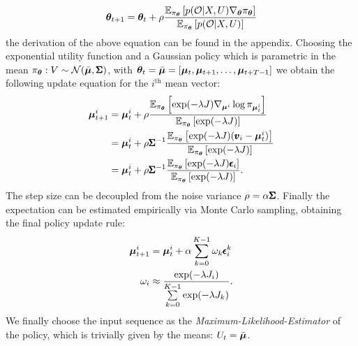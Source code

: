 \begin{equation}
    \boldsymbol{\theta}_{t+1} = \boldsymbol{\theta}_t + \rho \frac{\mathbb{E}_{\pi_{\boldsymbol{\theta}}} \left [p(\mathcal{O} | X, U) \nabla_{\boldsymbol{\theta}}\pi_{\boldsymbol{\theta}}\right]}{\mathbb{E}_{\pi_{\boldsymbol{\theta}}} \left [p(\mathcal{O} | X, U)\right]}
\end{equation}
the derivation of the above equation can be found in the appendix. 
Choosing the exponential utility function and a Gaussian policy which is parametric in the mean $\pi_{\boldsymbol{\theta}}: V \sim \mathcal{N}(\bar{\boldsymbol{\mu}}, \pmb{\Sigma})$, with $\boldsymbol{\theta}_t = \bar{\boldsymbol{\mu}} = [\boldsymbol{\mu}_t, \boldsymbol{\mu}_{t+1}, \dots, \boldsymbol{\mu}_{t+T-1}]$ we obtain the following update equation for the $i^{\text{th}}$ mean vector:
\begin{align}
    \boldsymbol{\mu}^{i}_{t+1} &=  \boldsymbol{\mu}^{i}_{t} + \rho \frac{\mathbb{E}_{\pi_{\boldsymbol{\theta}}} \left [ \exp( -\lambda J) \nabla_{\boldsymbol{\mu}^{i}} \log \pi_{\boldsymbol{\mu}^{i}_{t}}\right]}{\mathbb{E}_{\pi_{\boldsymbol{\theta}}} \left [\exp( -\lambda J)\right]} \\
    &= \boldsymbol{\mu}^{i}_{t} +  \rho \pmb{\Sigma}^{-1}\frac{\mathbb{E}_{\pi_{\boldsymbol{\theta}}} \left [\exp( -\lambda J) (\pmb{v}_i - \boldsymbol{\mu}^{i}_{t} )\right]}{\mathbb{E}_{\pi_{\boldsymbol{\theta}}} \left [\exp( -\lambda J)\right]}  \label{eq:bayes_to_mppi} \\
    &= \boldsymbol{\mu}^{i}_{t} +  \rho \pmb{\Sigma}^{-1} \frac{\mathbb{E}_{\pi_{\boldsymbol{\theta}}} \left [\exp( -\lambda J) \pmb{\epsilon}_i \right]}{\mathbb{E}_{\pi_{\boldsymbol{\theta}}} \left [\exp( -\lambda J)\right]}  \label{eq:alpha_assumption}.
\end{align}
The step size can be decoupled from the noise variance $\rho = \alpha \pmb{\Sigma} $. Finally the expectation can be estimated empirically via Monte Carlo sampling, obtaining the final policy update rule:
\begin{align} \label{eq:update_rule}
  \boldsymbol{\mu}^{i}_{t+1} &= \boldsymbol{\mu}^{i}_{t} + \alpha  \sum \limits_{k=0}^{K-1}  \omega_k \pmb{\epsilon}_{i}^{k} \\
  \omega_i  &\approx \frac{\exp ( -\lambda J_i )}{\sum \limits_{k=0}^{K-1} \exp ( -\lambda J_k)}.
\end{align}
We finally choose the input sequence as the \emph{Maximum-Likelihood-Estimator} of the policy, which is trivially given by the means: $U_t = \bar{\boldsymbol{\mu}}$.

